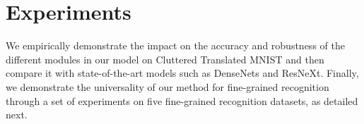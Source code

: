 \documentclass[runningheads]{llncs}
\begin{document}
\iffalse
\subsection{Regularization of the Attention Heads}
Since the different attention heads in an attention module can learn to focus on the same exact part of the image, similarly to \cite{zhao2017diversified}, we have introduced a regularization loss $L_R$ that forces the multiple masks to be different. In order to simplify the notation, we set $\mathbf{h}^l_k$ to be $k^{th}$ flattened version of the attention mask $\mathbf{H}^l$ in Equation \ref{eq:atthead1}. Then, the regularization loss is expressed as:

\begin{equation}
\label{eq:regularization}
\mathcal{L}_R = \sum_{i=1}^K \sum_{j\neq i} || \mathbf{h}^l_i (\mathbf{h}^l_j)^T||^2_2,
\end{equation}

\emph{i.e.}, it minimizes the squared Frobenius norm of the off-diagonal cross-correlation matrix formed by the squared inner product of each pair of different attention masks, pushing them towards orthogonality ($\mathcal{L}_R=0$). This loss is added to the network loss $\mathcal{L}_{net}$ weighted by a constant factor $\gamma=0.001$ which was found to work best across all tasks:

\begin{equation}
\mathcal{L}_{net}^* = \mathcal{L}_{net} + \gamma \mathcal{L}_R
\end{equation}

\fi

\section{Experiments}
We empirically demonstrate the impact on the accuracy and robustness of the different modules in our model on Cluttered Translated MNIST and then compare it with state-of-the-art models such as DenseNets and ResNeXt. Finally, we demonstrate the universality of our method for fine-grained recognition through a set of experiments on five fine-grained recognition datasets, as detailed next.
\end{document}
